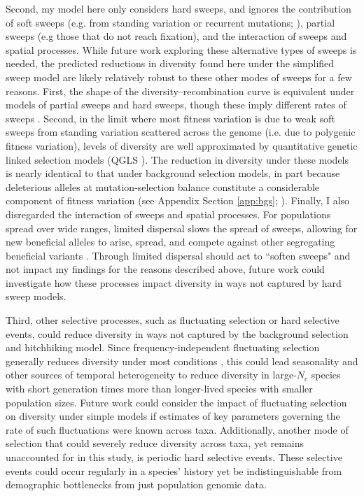 \documentclass[11pt]{article}
\begin{document}
Second, my model here only considers hard sweeps, and ignores the contribution
of soft sweeps (e.g. from standing variation or recurrent mutations;
\cite{Hermisson2005-hs,Pennings2006-lj}), partial sweeps (e.g those that do not
reach fixation), and the interaction of sweeps and spatial processes. While
future work exploring these alternative types of sweeps is needed, the
predicted reductions in diversity found here under the simplified sweep model
are likely relatively robust to these other modes of sweeps for a few reasons.
First, the shape of the diversity--recombination curve is equivalent under
models of partial sweeps and hard sweeps, though these imply different rates of
sweeps \parencite{Coop2012-cd}. Second, in the limit where most fitness
variation is due to weak soft sweeps from standing variation scattered across
the genome (i.e. due to polygenic fitness variation), levels of diversity are
well approximated by quantitative genetic linked selection models (QGLS
\cite{Robertson1961-ho,Santiago1995-hx,Santiago1998-bs}). The reduction in
diversity under these models is nearly identical to that under background
selection models, in part because deleterious alleles at mutation-selection
balance constitute a considerable component of fitness variation (see Appendix
Section \ref{app:bgs}; \cite{Charlesworth2000-km,Charlesworth2015-am}).
Finally, I also disregarded the interaction of sweeps and spatial processes.
For populations spread over wide ranges, limited dispersal slows the spread of
sweeps, allowing for new beneficial alleles to arise, spread, and compete
against other segregating beneficial variants
\parencite{Ralph2015-kl,Ralph2010-ki}. Through limited dispersal should act to
``soften sweeps" and not impact my findings for the reasons described above,
future work could investigate how these processes impact diversity in ways not
captured by hard sweep models.

Third, other selective processes, such as fluctuating selection or hard
selective events, could reduce diversity in ways not captured by the background
selection and hitchhiking model. Since frequency-independent fluctuating
selection generally reduces diversity under most conditions
\parencite{Novak2017-yp}, this could lead seasonality and other sources of
temporal heterogeneity to reduce diversity in large-$N_c$ species with short
generation times more than longer-lived species with smaller population sizes.
Future work could consider the impact of fluctuating selection on diversity
under simple models \parencite{Barton2000-zg} if estimates of key parameters
governing the rate of such fluctuations were known across taxa. Additionally,
another mode of selection that could severely reduce diversity across taxa, yet
remains unaccounted for in this study, is periodic hard selective events. These
selective events could occur regularly in a species' history yet be
indistinguishable from demographic bottlenecks from just population genomic
data. 
\end{document}
